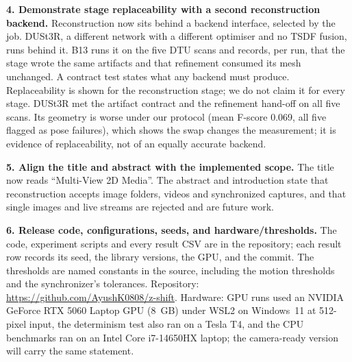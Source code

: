 \documentclass[11pt,a4paper]{article}
\newcommand{\request}[1]{\par\medskip\noindent\textbf{#1}}
\begin{document}
\request{4. Demonstrate stage replaceability with a second reconstruction backend.}
Reconstruction now sits behind a backend interface, selected by the job. DUSt3R,
a different network with a different optimiser and no TSDF fusion, runs behind
it. B13 runs it on the five DTU scans and records, per run, that the stage wrote
the same artifacts and that refinement consumed its mesh unchanged. A contract
test states what any backend must produce.
Replaceability is shown for the reconstruction stage; we do not claim it for
every stage. DUSt3R met the artifact contract and the refinement hand-off on
all five scans. Its geometry is worse under our protocol (mean F-score 0.069,
all five flagged as pose failures), which shows the swap changes the
measurement; it is evidence of replaceability, not of an equally accurate
backend.

\request{5. Align the title and abstract with the implemented scope.}
The title now reads ``Multi-View 2D Media''. The abstract and introduction state that
reconstruction accepts image folders, videos and synchronized captures, and
that single images and live streams are rejected and are future work.

\request{6. Release code, configurations, seeds, and hardware/thresholds.}
The code, experiment scripts and every result CSV are in the repository; each result row
records its seed, the library versions, the GPU, and the commit. The thresholds
are named constants in the source, including the motion thresholds and the
synchronizer's tolerances.
Repository: \url{https://github.com/AyushK0808/z-shift}. Hardware: GPU runs used an
NVIDIA GeForce RTX 5060 Laptop GPU (8~GB) under WSL2 on Windows~11 at 512-pixel
input, the determinism test also ran on a Tesla T4, and the CPU benchmarks ran
on an Intel Core i7-14650HX laptop; the camera-ready version will carry the same
statement.
\end{document}
